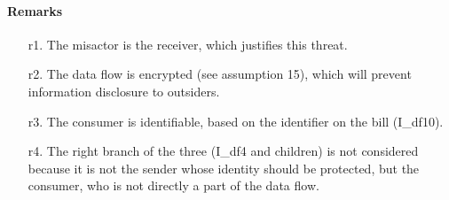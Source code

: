 \paragraph{Remarks}
\begin{enumerate}
	\item[r1.] The misactor is the receiver, which justifies this threat.
	\item[r2.] The data flow is encrypted (see assumption 15), which will prevent
	information disclosure to outsiders.
	\item[r3.] The consumer is identifiable, based on the identifier on the bill
	(I\_df10).
	\item[r4.] The right branch of the three (I\_df4 and children) is not
	considered because it is not the sender whose identity should be protected, but the
	consumer, who is not directly a part of the data flow.
\end{enumerate}
